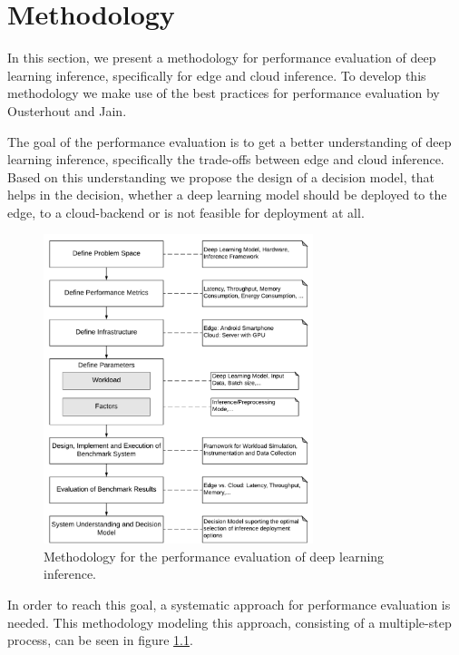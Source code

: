 \chapter{Methodology}
\label{chap:methodology}

In this section, we present a methodology for performance evaluation of deep learning inference, specifically for edge and cloud inference.
To develop this methodology we make use of the best practices for performance evaluation by Ousterhout \cite{Ousterhout:2018:AMO:3234519.3213770} and Jain\cite{books/daglib/0076234}.

The goal of the performance evaluation is to get a better understanding of deep learning inference, specifically the trade-offs between edge and cloud inference.
Based on this understanding we propose the design of a decision model, that helps in the decision, whether a deep learning model should be deployed to the edge, to a cloud-backend or is not feasible for deployment at all.


\begin{figure}[!htb]
\centering
\includegraphics[width=0.7\textwidth]{./Bilder/Methodology.pdf}
\caption{Methodology for the performance evaluation of deep learning inference.}
\label{fig:Methodology}
\end{figure}
In order to reach this goal, a systematic approach for performance evaluation is needed.
This methodology modeling this approach, consisting of a multiple-step process, can be seen in figure \ref{fig:Methodology}. 




